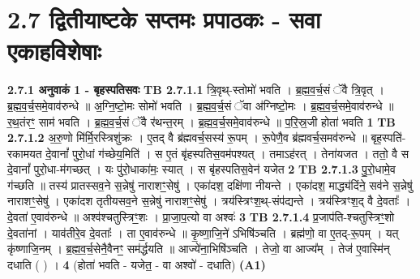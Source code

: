 \documentclass[17pt]{extarticle}
\begin{document}
{     \section*{ 2.7     द्वितीयाष्टके सप्तमः प्रपाठकः - सवा एकाहविशेषाः }
                \textbf{ 2.7.1     अनुवाकं   1 - बृहस्पतिसवः} \newline
                                \textbf{ TB 2.7.1.1} \newline
                  त्रि॒वृथ्-स्तोमो॑ भवति । ब्र॒ह्म॒व॒र्च॒सं ॅवै त्रि॒वृत् । ब्र॒ह्म॒व॒र्च॒समे॒वाव॑रुन्धे ॥ अ॒ग्नि॒ष्टो॒मः सोमो॑ भवति । ब्र॒ह्म॒व॒र्च॒सं ॅवा अ॑ग्निष्टो॒मः । ब्र॒ह्म॒व॒र्च॒समे॒वाव॑रुन्धे ॥ र॒थ॒तंरꣳ॒ साम॑ भवति । ब्र॒ह्म॒व॒र्च॒सं ॅवै र॑थन्त॒रम् । ब्र॒ह्म॒व॒र्च॒समे॒वाव॑रुन्धे ॥ प॒रि॒स्र॒जी होता॑ भवति \textbf{ 1} \newline
                  \newline
                                \textbf{ TB 2.7.1.2} \newline
                  अ॒रु॒णो मि॑र्मि॒रस्त्रिशु॑क्रः । ए॒तद् वै ब्र॑ह्मवर्च॒सस्य॑ रू॒पम् । रू॒पेणै॒व ब्र॑ह्मवर्च॒समव॑रुन्धे ॥ बृह॒स्पति॑-रकामयत दे॒वानां᳚ पुरो॒धां ग॑च्छेय॒मिति॑ । स ए॒तं बृ॑हस्पतिस॒वम॑पश्यत् । तमाऽह॑रत् । तेना॑यजत । ततो॒ वै स दे॒वानां᳚ पुरो॒धा-म॑गच्छत् । यः पु॑रो॒धाका॑मः॒ स्यात् । स बृ॑हस्पतिस॒वेन॑ यजेत \textbf{ 2} \newline
                  \newline
                                \textbf{ TB 2.7.1.3} \newline
                  पु॒रो॒धामे॒व ग॑च्छति ॥ तस्य॑ प्रातस्सव॒ने स॒न्नेषु॑ नाराशꣳ॒॒सेषु॑ । एका॑दश॒ दक्षि॑णा नीयन्ते । एका॑दश॒ माद्ध्य॑दिंने॒ सव॑ने स॒न्नेषु॑ नाराशꣳ॒॒सेषु॑ । एका॑दश तृतीयसव॒ने स॒न्नेषु॑ नाराशꣳ॒॒सेषु॑ । त्रय॑स्त्रिꣳश॒थ्-संप॑द्यन्ते । त्रय॑स्त्रिꣳश॒द् वै दे॒वताः᳚ । दे॒वता॑ ए॒वाव॑रुन्धे ॥ अश्व॑श्चतुस्त्रिꣳ॒॒शः । प्रा॒जा॒प॒त्यो वा अश्वः॑ \textbf{ 3} \newline
                  \newline
                                \textbf{ TB 2.7.1.4} \newline
                  प्र॒जाप॑ति-श्चतुस्त्रिꣳ॒॒शो दे॒वता॑नां । याव॑तीरे॒व दे॒वताः᳚ । ता ए॒वाव॑रुन्धे ॥ कृ॒ष्णा॒जि॒ने॑ ऽभिषि॑ञ्चति । ब्रह्म॑णो॒ वा ए॒तद्-रू॒पम् । यत् कृ॑ष्णाजि॒नम् । ब्र॒ह्म॒व॒र्च॒सेनै॒वैनꣳ॒॒ सम॑र्द्धयति ॥ आज्ये॑ना॒भिषि॑ञ्चति । तेजो॒ वा आज्य᳚म् । तेज॑ ए॒वास्मि॑न् दधाति ( ) । \textbf{ 4} \newline
                  \newline
                                    (होता॑ भवति - यजेत॒ - वा अश्वो॑ - दधाति) \textbf{(A1)} \newline \newline
}
\end{document}
